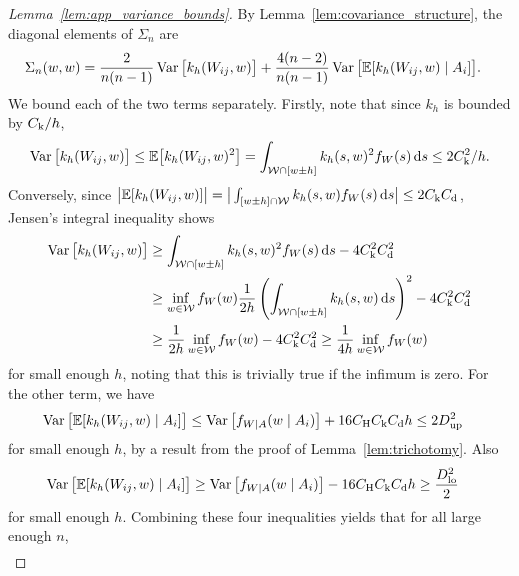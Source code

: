 \begin{proof}[Lemma~\ref{lem:app_variance_bounds}]

  By Lemma~\ref{lem:covariance_structure},
  the diagonal elements of $\Sigma_n$ are
  \begin{align*}
    \Sigma_n(w,w)
    &=
    \frac{2}{n(n-1)}
    \operatorname{Var}\big[
      k_h(W_{i j},w)
    \big]
    +
    \frac{4(n-2)}{n(n-1)}
    \operatorname{Var}\big[
      \mathbb{E}[k_h(W_{i j},w) \mid A_i]
    \big].
  \end{align*}
  We bound each of the two terms separately.
  Firstly, note that since $k_h$ is bounded by $C_\mathrm{k}/h$,
  \begin{align*}
    \operatorname{Var}\big[
      k_h(W_{i j},w)
    \big]
    \leq
    \mathbb{E}\big[
      k_h(W_{i j},w)^2
    \big]
    =
    \int_{\mathcal{W} \cap [w \pm h]}
    k_h(s,w)^2
    f_W(s)
    \,\mathrm{d}s
    \leq 2 C_\mathrm{k}^2 / h.
  \end{align*}
  Conversely, since
  $\big|\mathbb{E}[k_h(W_{i j},w)]\big|
  = \big|\int_{[w \pm h] \cap \mathcal{W}} k_h(s,w) f_W(s) \,\mathrm{d}s\big|
  \leq 2 C_\mathrm{k} C_\mathrm{d}$,
  Jensen's integral inequality shows
  \begin{align*}
    \operatorname{Var}\big[
      k_h(W_{i j},w)
    \big]
    &\geq
    \int_{\mathcal{W} \cap [w \pm h]}
    k_h(s,w)^2
    f_W(s)
    \,\mathrm{d}s
    - 4 C_\mathrm{k}^2 C_\mathrm{d}^2 \\
    &\geq
    \inf_{w \in \mathcal{W}} f_W(w)
    \frac{1}{2h}
    \left(
      \int_{\mathcal{W} \cap [w \pm h]}
      k_h(s,w)
      \,\mathrm{d}s
    \right)^2
    - 4 C_\mathrm{k}^2 C_\mathrm{d}^2 \\
    &\geq
    \frac{1}{2h}
    \inf_{w \in \mathcal{W}} f_W(w)
    - 4 C_\mathrm{k}^2 C_\mathrm{d}^2
    \geq
    \frac{1}{4h}
    \inf_{w \in \mathcal{W}} f_W(w)
  \end{align*}
  for small enough $h$, noting that this is trivially true
  if the infimum is zero.
  For the other term, we have
  \begin{align*}
    \operatorname{Var}\big[
      \mathbb{E}[k_h(W_{i j},w) \mid A_i]
    \big]
    &\leq
    \operatorname{Var}\big[
      f_{W \mid A}(w \mid A_i)
    \big]
    + 16 C_\mathrm{H} C_\mathrm{k} C_\mathrm{d} h
    \leq
    2 D_{\textup{up}}^2
  \end{align*}
  for small enough $h$, by a result from
  the proof of Lemma~\ref{lem:trichotomy}.
  Also
  \begin{align*}
    \operatorname{Var}\big[
      \mathbb{E}[k_h(W_{i j},w) \mid A_i]
    \big]
    &\geq
    \operatorname{Var}\big[
      f_{W \mid A}(w \mid A_i)
    \big]
    - 16 C_\mathrm{H} C_\mathrm{k} C_\mathrm{d} h
    \geq
    \frac{D_{\textup{lo}}^2}{2}
  \end{align*}
  for small enough $h$.
  Combining these four inequalities yields
  that for all large enough $n$,
  \begin{align*}

\end{align*}
\end{proof}

